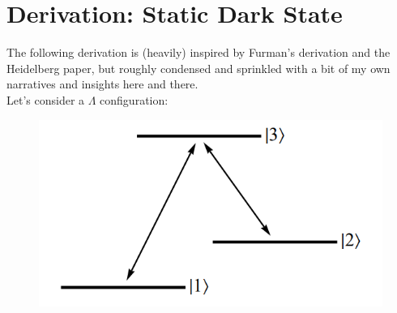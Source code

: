 \documentclass{article}
\theoremstyle{definition}
\begin{document}
\section{Derivation: Static Dark State}

The following derivation is (heavily) inspired by Furman's derivation and the Heidelberg paper, but roughly condensed and sprinkled with a bit of my own narratives and insights here and there. \\

Let's consider a $\Lambda$ configuration:
\begin{figure}[h!]
	\centering
	\includegraphics[scale=0.5]{Lambda.PNG}
	\caption{}
\end{figure}
\end{document}
